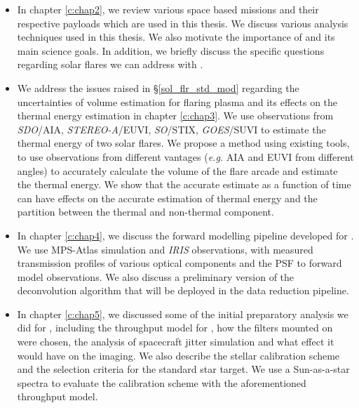 \begin{itemize}

    \item In chapter \ref{c:chap2}, we review various space based missions and their respective payloads which are used in this thesis. We discuss various analysis techniques used in this thesis. We also motivate the importance of {\suit} and its main science goals. In addition, we briefly discuss the specific questions regarding solar flares we can address with {\suit}.

    \item We address the issues raised in \S\ref{sol_flr_std_mod} regarding the uncertainties of volume estimation for flaring plasma and its effects on the thermal energy estimation in chapter \ref{c:chap3}. We use observations from {\it SDO}/AIA, {\it STEREO-A}/EUVI, {\it SO}/STIX, {\it GOES}/SUVI to estimate the thermal energy of two solar flares. We propose a method using existing tools, to use observations from different vantages ({\it e.g.} AIA and EUVI from different angles) to accurately calculate the volume of the flare arcade and estimate the thermal energy. We show that the accurate estimate as a function of time can have effects on the accurate estimation of thermal energy and the partition between the thermal and non-thermal component.

    \item In chapter \ref{c:chap4}, we discuss the forward modelling pipeline developed for {\suit}. We use MPS-Atlas simulation and {\it IRIS} observations, with measured transmission profiles of various optical components and the PSF to forward model {\suit} observations. We also discuss a preliminary version of the deconvolution algorithm that will be deployed in the data reduction pipeline.

    \item In chapter \ref{c:chap5}, we discussed some of the initial preparatory analysis we did for {\suit}, including the throughput model for {\suit}, how the filters mounted on {\suit} were chosen, the analysis of spacecraft jitter simulation and what effect it would have on the imaging. We also describe the stellar calibration scheme and the selection criteria for the standard star target. We use a Sun-as-a-star spectra to evaluate the calibration scheme with the aforementioned throughput model.
    

\end{itemize}
